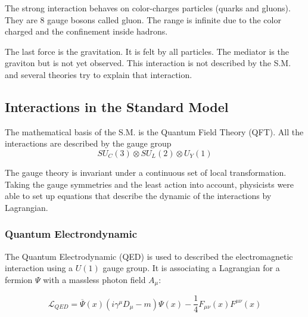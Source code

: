     The strong interaction behaves on color-charges particles (quarks and gluons).
    They are 8 gauge bosons called gluon.
    The range is infinite due to the color charged and the confinement inside hadrons.

    The last force is the gravitation. 
    It is felt by all particles.
    The mediator is the graviton but is not yet observed.
    This interaction is not described by the S.M. and several theories try to explain that interaction.


    \subsection{Interactions in the Standard Model}

	The mathematical basis of the S.M. is the Quantum Field Theory (QFT). All the interactions are described by the gauge group 
    \begin{equation}
    	SU_C(3) \otimes SU_L(2) \otimes U_Y(1)
	\end{equation}
    
    The gauge theory is invariant under a continuous set of local transformation.
    Taking the gauge symmetries and the least action into account, physicists were able to set up equations that describe the dynamic of the interactions by Lagrangian.
    
      \subsubsection{Quantum Electrondynamic}
	The Quantum Electrodynamic (QED) is used to described the electromagnetic interaction using a $U(1)$ gauge group. It is associating a Lagrangian for a fermion $\Psi$ with a massless photon field $A_\mu$:
    
    \begin{equation}
    	\mathcal{L}_{QED} =  \overline{\Psi}\left(x\right)\left( i \gamma^\mu D_\mu - m \right) \Psi\left(x\right) - \frac{1}{4}F_{\mu \nu}\left(x\right) F^{\mu \nu}\left(x\right)
    \end{equation}

